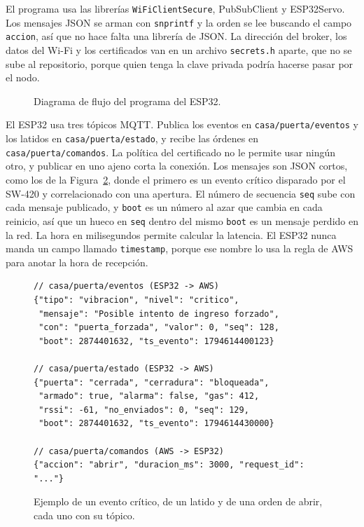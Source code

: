 \documentclass[manuscript,screen,nonacm]{acmart}
\begin{document}
El programa usa las librerías \texttt{WiFiClientSecure}, PubSubClient y ESP32Servo. Los mensajes JSON se arman con \texttt{snprintf} y la orden se lee buscando el campo \texttt{accion}, así que no hace falta una librería de JSON. La dirección del broker, los datos del Wi-Fi y los certificados van en un archivo \texttt{secrets.h} aparte, que no se sube al repositorio, porque quien tenga la clave privada podría hacerse pasar por el nodo.

\begin{figure}[htbp]
\centering
{}
\caption{Diagrama de flujo del programa del ESP32.}
\label{fig:flujo}
\end{figure}

El ESP32 usa tres tópicos MQTT. Publica los eventos en \texttt{casa/\allowbreak puerta/\allowbreak eventos} y los latidos en \texttt{casa/\allowbreak puerta/\allowbreak estado}, y recibe las órdenes en \texttt{casa/\allowbreak puerta/\allowbreak comandos}. La política del certificado no le permite usar ningún otro, y publicar en uno ajeno corta la conexión. Los mensajes son JSON cortos, como los de la Figura~\ref{fig:mensaje}, donde el primero es un evento crítico disparado por el SW-420 y correlacionado con una apertura. El número de secuencia \texttt{seq} sube con cada mensaje publicado, y \texttt{boot} es un número al azar que cambia en cada reinicio, así que un hueco en \texttt{seq} dentro del mismo \texttt{boot} es un mensaje perdido en la red. La hora en milisegundos permite calcular la latencia. El ESP32 nunca manda un campo llamado \texttt{timestamp}, porque ese nombre lo usa la regla de AWS para anotar la hora de recepción.

\begin{figure}[htbp]
\centering
\begin{minipage}{0.95\linewidth}
\begin{lstlisting}
// casa/puerta/eventos (ESP32 -> AWS)
{"tipo": "vibracion", "nivel": "critico",
 "mensaje": "Posible intento de ingreso forzado",
 "con": "puerta_forzada", "valor": 0, "seq": 128,
 "boot": 2874401632, "ts_evento": 1794614400123}

// casa/puerta/estado (ESP32 -> AWS)
{"puerta": "cerrada", "cerradura": "bloqueada",
 "armado": true, "alarma": false, "gas": 412,
 "rssi": -61, "no_enviados": 0, "seq": 129,
 "boot": 2874401632, "ts_evento": 1794614430000}

// casa/puerta/comandos (AWS -> ESP32)
{"accion": "abrir", "duracion_ms": 3000, "request_id": "..."}
\end{lstlisting}
\end{minipage}
\caption{Ejemplo de un evento crítico, de un latido y de una orden de abrir, cada uno con su tópico.}
\label{fig:mensaje}
\end{figure}
\end{document}
